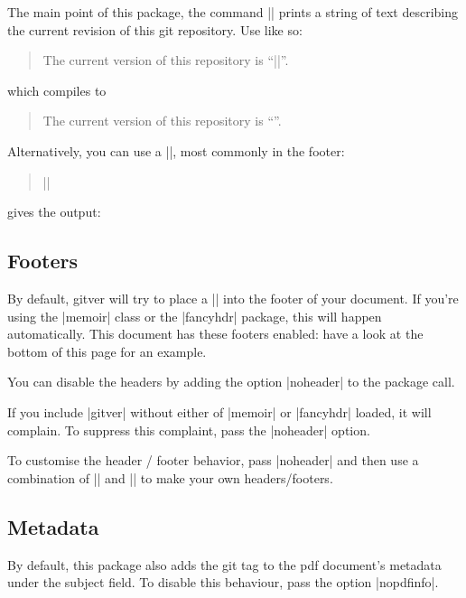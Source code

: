 \documentclass[a4paper]{ltxdoc}
\begin{document}

\DescribeMacro{\gitVer}
%
The main point of this package, the command |\gitVer| prints a string of text
describing the current revision of this git repository. Use like so:
\begin{quote}
	The current version of this repository is ``|\gitVer{}|''.
\end{quote}
which compiles to
\begin{quote}
	The current version of this repository is ``\gitVer{}''.
\end{quote}

\DescribeMacro{\versionBox}
Alternatively, you can use a |\versionBox|, most commonly in the footer:
\begin{quote}
	|\versionBox{}|
\end{quote}
%
gives the output:
\vspace{3mm}

\versionBox{}

\subsection{Footers} %
\label{sub:footers}

By default, \textsf{gitver} will try to place a |\versionBox| into the footer of
your document. If you're using the |memoir| class or the |fancyhdr| package,
this will happen automatically. This document has these footers enabled: have a
look at the bottom of this page for an example. 

You can disable the headers by adding the option |noheader| to the package call. 

If you include |gitver| without either of |memoir| or |fancyhdr| loaded, it will
complain. To suppress this complaint, pass the |noheader| option. 

To customise the header / footer behavior, pass |noheader| and then use a
combination of |\versionBox| and |\gitVer| to make your own headers/footers. 


\subsection{Metadata} %
\label{sub:metadata}

 By default, this package also adds the git tag to the
pdf document's metadata under the subject field. To disable this behaviour, pass
the option |nopdfinfo|. 
\end{document}
